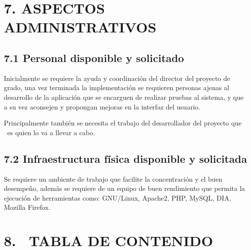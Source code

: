 \documentclass[12pt,letterpaper,oneside]{article}
\begin{document}
\bigskip

\section{7. ASPECTOS ADMINISTRATIVOS}

\bigskip

\subsection{7.1 Personal disponible y solicitado}

\bigskip

Inicialmente se requiere la ayuda y coordinación del director del
proyecto de grado, una vez terminada la implementación se requieren
personas ajenas al desarrollo de la aplicación que se encarguen de
realizar pruebas al sistema, y que a su vez aconsejen y propongan
mejoras en la interfaz del usuario.

Principalmente también se necesita el trabajo del desarrollador del
proyecto que \ es quien lo va a llevar a cabo.


\bigskip

\subsection{7.2 Infraestructura física disponible y solicitada}

\bigskip

Se requiere un ambiente de trabajo que facilite la concentración y el
buen desempeño, además se requiere de un equipo de buen rendimiento
que permita la ejecución de herramientas como: GNU/Linux, Apache2,
PHP, MySQL, DIA, Mozilla Firefox.


\bigskip


\bigskip


\bigskip


\bigskip


\bigskip

\section[8. \ TABLA DE CONTENIDO]{8. \ TABLA DE CONTENIDO}

\bigskip
\end{document}
